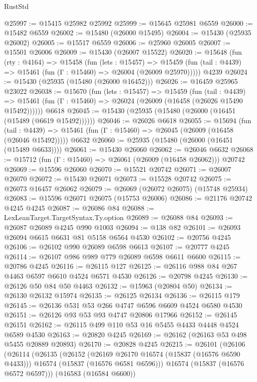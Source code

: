 \begin{lexlean}{RustStd}
\begin{coremodule}
{\begin{coremodule}
{{{{{{{{{{{{{{{{{{{{{{{{{{{{{{{{{{{{{{{{{{{{{{{{{{{{{{{{{{{{@25997 := @15415 @25982 @25992
@25999 := @15645 @25981 @6559
@26000 := @15482 @6559
@26002 := @15480 (@26000 @15495)
@26004 := @15430 (@25935 @26002)
@26005 := @15517 @6559
@26006 := @25960 @26005
@26007 := @15501 @26006
@26009 := @15430 (@26007 @15522)
@26020 := @15648
    (fun (rty : @4164) =>
    @15458
      (fun (lets : @15457) =>
      @15459 (fun (tail : @4439) => @15461 (fun (Γ : @15460) => @26004 (@26009 @25970)))))
    @4239
@26024 := @15430 (@25935 (@15480 (@26000 @16452)))
@26026 := @16459 @25965 @23022
@26038 := @15670
    (fun (lets : @15457) =>
    @15459
      (fun (tail : @4439) =>
      @15461 (fun (Γ : @15460) => @26024 (@26009 (@16458 (@26026 @15490 @15492))))))
    @6618
@26045 := @15430 (@25935 (@15480 (@26000 (@16451 (@15489 (@6619 @15492))))))
@26046 := @26026 @6618
@26055 := @15694
    (fun (tail : @4439) => @15461 (fun (Γ : @15460) => @26045 (@26009 (@16458 (@26046 @15492)))))
    @6632
@26060 := @25935 (@15480 (@26000 (@16451 (@15489 @6633))))
@26061 := @15430 @26060
@26062 := @26046 @6632
@26068 := @15712 (fun (Γ : @15460) => @26061 (@26009 (@16458 @26062))) @20742
@26069 := @15596 @26060
@26070 := @15521 @20742
@26071 := @26007 @26070
@26072 := @15430 @26071
@26073 := @15528 @20742
@26075 := @26073 @16457 @26062
@26079 := @26069 (@26072 @26075) (@15748 @25934)
@26083 := @15596 @26071 @26075 (@15753 @26006)
@26086 := @21176 @20742 @4245 @4245
@26087 := @26086 @84
@26088 := LexLeanTarget.TargetSyntax.Ty.option
@26089 := @26088 @84
@26093 := @26087 @26089 @4245 @990 @1003
@26094 := @138 @82
@26101 := @26093 @26094 @6615 @6631 @81 @5158 @6564 @4530
@26102 := @20756 @4245
@26106 := @26102 @990 @26089 @6598 @6613
@26107 := @20777 @4245
@26114 := @26107 @986 @989 @779 @26089 @6598 @6611 @6600
@26115 := @20786 @4245
@26116 := @26115 @127
@26125 := @26116 @988 @84 @267 @4463 @6597 @6610 @4524 @6571 @4530
@26126 := @20798 @4245
@26130 := @26126 @50 @84 @50 @4463
@26132 := @15963 (@20804 @50)
@26134 := @26130 @26132 @15974
@26135 := @26125 @26134
@26136 := @26115 @179
@26145 := @26136 @531 @53 @266 @4747 @6596 @6609 @4524 @6580 @4530
@26151 := @26126 @93 @53 @93 @4747 @20806 @17966
@26152 := @26145 @26151
@26162 := @26115 @499 @110 @53 @16 @5455 @4433 @4448 @4524 @6589 @4530
@26163 := @20820 @4245
@26169 := @26162 (@26163 @53 @498 @5455 @20889 @20893)
@26170 := @20828 @4245
@26215 := @26101
    (@26106
      (@26114
        (@26135
          (@26152
            (@26169 @26170 @16574 (@15837 (@16576 @6590 @4433)))
            @16574
            (@15837 (@16576 @6581 @6596)))
          @16574
          (@15837 (@16576 @6572 @6597)))
        (@16583 (@16584 @6600))
}}}}}}}}}}}}}}}}}}}}}}}}}}}}}}}}}}}}}}}}}}}}}}}}}}}}}}}}}}}}
\end{coremodule}}
\end{coremodule}
\end{lexlean}
